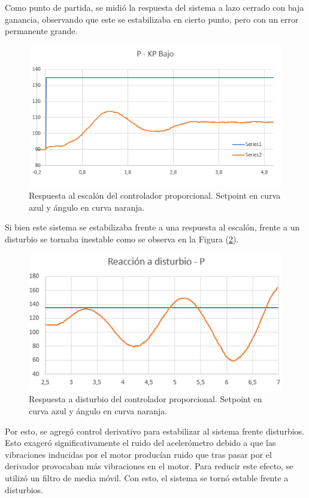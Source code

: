 Como punto de partida, se midió la respuesta del sistema a lazo cerrado con baja ganancia, observando que este se estabilizaba en cierto punto, pero con un error permanente grande. 

\begin{figure}[H]
    \centering
    \includegraphics[width=\textwidth]{./Imagenes/kplow.png}
    \caption{Respuesta al escalón del controlador proporcional. Setpoint en curva azul y ángulo en curva naranja.}
    \label{fig:kplow}
\end{figure}

Si bien este sistema se estabilizaba frente a una respuesta al escalón, frente a un disturbio se tornaba inestable como se observa en la Figura (\ref{fig:kpdist}).

\begin{figure}[H]
    \centering
    \includegraphics[width=\textwidth]{./Imagenes/kpdist.png}
    \caption{Respuesta a disturbio del controlador proporcional. Setpoint en curva azul y ángulo en curva naranja.}
    \label{fig:kpdist}
\end{figure}

Por esto, se agregó control derivativo para estabilizar al sistema frente disturbios. Esto exageró significativamente el ruido del acelerómetro debido a que las vibraciones inducidas por el motor producían ruido que tras pasar por el derivador provocaban más vibraciones en el motor. Para reducir este efecto, se utilizó un filtro de media móvil. Con esto, el sistema se tornó estable frente a disturbios.


